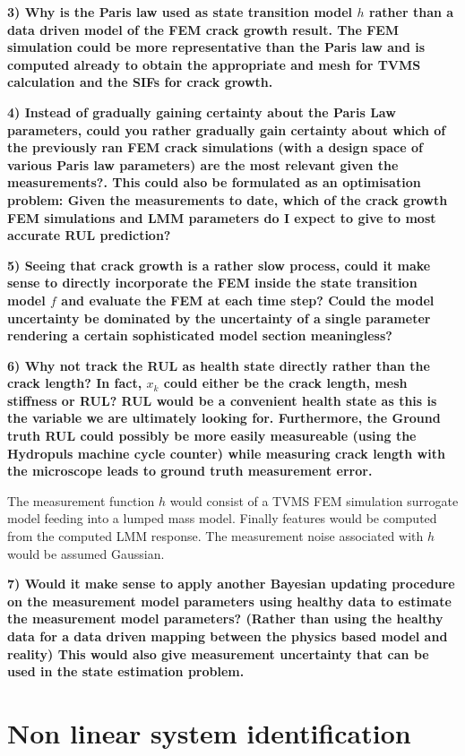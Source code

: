 \textbf{3) Why is the Paris law used as state transition model $h$ rather than a data driven model of the FEM crack growth result. The FEM simulation could be more representative than the Paris law and is computed already to obtain the appropriate and mesh for TVMS calculation and the SIFs for crack growth.}

\textbf{4) Instead of gradually gaining certainty about the Paris Law parameters, could you rather gradually gain certainty about which of the previously ran FEM crack simulations (with a design space of various Paris law parameters) are the most relevant given the measurements?. This could also be formulated as an optimisation problem: Given the measurements to date, which of the crack growth FEM simulations and LMM parameters do I expect to give to most accurate RUL prediction?}

\textbf{5) Seeing that crack growth is a rather slow process, could it make sense to directly incorporate the FEM inside the state transition model $f$ and evaluate the FEM at each time step? Could the model uncertainty be dominated by the uncertainty of a single parameter rendering a certain sophisticated model section meaningless?}

\textbf{6) Why not track the RUL as health state directly rather than the crack length? In fact, $x_{k}$ could either be the crack length, mesh stiffness or RUL? RUL would be a convenient health state as this is the variable we are ultimately looking for. Furthermore, the Ground truth RUL could possibly be more easily measureable (using the Hydropuls machine cycle counter) while measuring crack length with the microscope leads to ground truth measurement error.}
	

The measurement function $h$ would consist of a TVMS FEM simulation surrogate model feeding into a lumped mass model. Finally features would be computed from the computed LMM response. The measurement noise associated with $h$ would be assumed Gaussian. 

\textbf{7) Would it make sense to apply another Bayesian updating procedure on the measurement model parameters using healthy data to estimate the measurement model parameters? (Rather than using the healthy data for a data driven mapping between the physics based model and reality) This would also give measurement uncertainty that can be used in the state estimation problem.}

\section{Non linear system identification}


